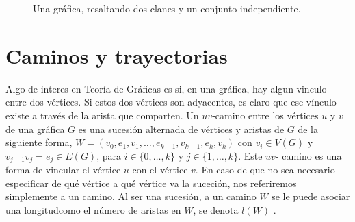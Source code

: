 \begin{figure}[ht!]
    \centering
    \caption{Una gr\'afica, resaltando dos clanes y un conjunto independiente.}
    \label{fig:ClanInd}
\end{figure}


\section{Caminos y trayectorias}
\label{sec:Caminos}


    Algo de interes en Teor\'ia de Gr\'aficas es si, en una gr\'afica, hay algun
    vinculo entre dos v\'ertices. Si estos dos v\'ertices son adyacentes, es
    claro que ese v\'inculo existe a trav\'es de la arista que comparten. Un
    $uv$-camino entre los v\'ertices $u$ y $v$ de una gr\'afica $G$ es una
    sucesi\'on alternada de v\'ertices y aristas de $G$ de la siguiente forma,
    $W=(v_0, e_1,v_1, \dots, e_{k-1},v_{k-1}, e_k,v_k)$ con $v_i \in V(G)$ y
    $v_{j-1}v_j = e_j \in E(G)$, para $i \in \{0, \dots, k\}$ y $j \in \{ 1,
    \dots, k\}$. Este $uv$- camino es una forma de vincular el v\'ertice $u$ con
    el v\'ertice $v$. En caso de que no sea necesario especificar de qu\'e
    v\'ertice a qu\'e v\'ertice va la suceci\'on, nos referiremos simplemente a
    un camino. Al ser una sucesi\'on, a un camino $W$ se le puede asociar una
    longitudcomo el n\'umero de aristas en $W$, se denota $l(W)$ . 
    
